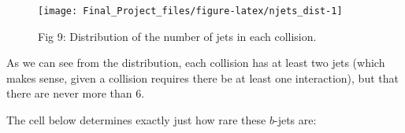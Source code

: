 \documentclass[
]{article}
\newenvironment{Shaded}{\begin{snugshade}}{\end{snugshade}}
\newcommand{\AttributeTok}[1]{\textcolor[rgb]{0.77,0.63,0.00}{#1}}
\newcommand{\DecValTok}[1]{\textcolor[rgb]{0.00,0.00,0.81}{#1}}
\newcommand{\FunctionTok}[1]{\textcolor[rgb]{0.00,0.00,0.00}{#1}}
\newcommand{\NormalTok}[1]{#1}
\newcommand{\OtherTok}[1]{\textcolor[rgb]{0.56,0.35,0.01}{#1}}
\newcommand{\SpecialCharTok}[1]{\textcolor[rgb]{0.00,0.00,0.00}{#1}}
\newcommand{\StringTok}[1]{\textcolor[rgb]{0.31,0.60,0.02}{#1}}
\begin{document}
\begin{Shaded}
\end{Shaded}

\begin{figure}

{\centering \texttt{[image: Final\_Project\_files/figure-latex/njets\_dist-1]} 

}

\caption{Fig 9: Distribution of the number of jets in each collision.}\label{fig:njets_dist}
\end{figure}

As we can see from the distribution, each collision has at least two
jets (which makes sense, given a collision requires there be at least
one interaction), but that there are never more than 6.

The cell below determines exactly just how rare these \(b\)-jets are:

\begin{Shaded}
\end{Shaded}
\end{document}
